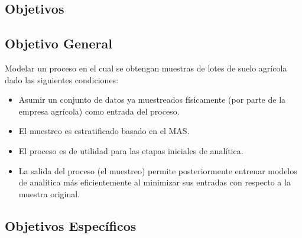 %
%

\subsection{Objetivos}

\subsection{Objetivo General}

Modelar un proceso en el cual se obtengan muestras de lotes de suelo agrícola dado las siguientes condiciones:

\begin{itemize}
    \item Asumir un conjunto de datos ya muestreados físicamente (por parte de la empresa agrícola) como entrada del proceso.

    \item El muestreo es estratificado basado en el MAS.

    \item El proceso es de utilidad para las etapas iniciales de analítica.

    \item La salida del proceso (el muestreo) permite posteriormente entrenar modelos de analítica más eficientemente al minimizar sus entradas con respecto a la muestra original.
\end{itemize}

\subsection{Objetivos Específicos}

